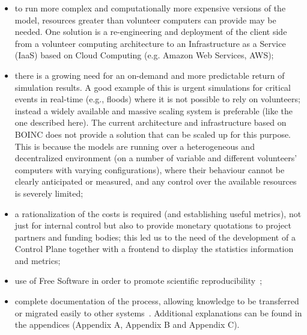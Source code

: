 \documentclass[journal abbreviation, manuscript]{copernicus}
\begin{document}
\begin{itemize}

\item to run more complex and computationally more expensive versions of the model, resources greater than volunteer computers can provide may be needed. One solution is a re-engineering and deployment of the client side from a volunteer computing architecture to an Infrastructure as a Service (IaaS) based on Cloud Computing (e.g. Amazon Web Services, AWS);

\item there is a growing need for an on-demand and more predictable return of simulation results. A good example of this is urgent simulations for critical events in real-time (e.g., floods) where it is not possible to rely on volunteers; instead a widely available and massive scaling system is preferable (like the one described here). The current architecture and infrastructure based on BOINC  does not provide a solution that can be scaled up for this purpose. This is because the models are running over a heterogeneous and decentralized environment (on a number of variable and different volunteers’ computers with varying configurations), where their behaviour cannot be clearly anticipated or measured, and any control over the available resources is severely limited;

\item a rationalization of the costs is required (and establishing useful metrics), not just for internal control but also to provide monetary quotations to project partners and funding bodies; this led us to the need of the development of a Control Plane together with a frontend to display the statistics information and metrics;

\item use of Free Software in order to promote scientific reproducibility~\citep{anel2011};

\item complete documentation of the process, allowing knowledge to be transferred or migrated easily to other systems~\citep{montes2014}. Additional explanations can be found in the appendices (Appendix A, Appendix B and Appendix C).
\end{itemize}
\end{document}

